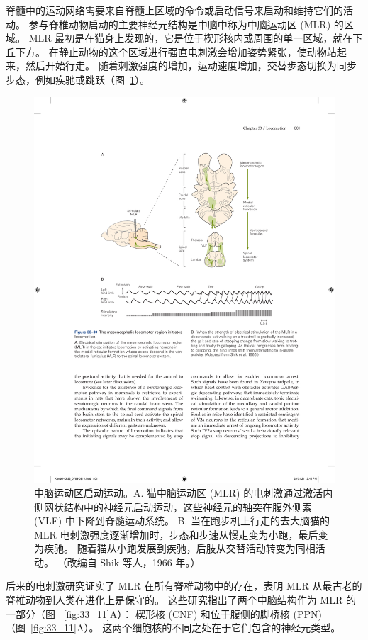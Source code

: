 脊髓中的运动网络需要来自脊髓上区域的命令或启动信号来启动和维持它们的活动。
参与脊椎动物启动的主要神经元结构是中脑中称为中脑运动区 (MLR) 的区域。
MLR 最初是在猫身上发现的，它是位于楔形核内或周围的单一区域，就在下丘下方。
在静止动物的这个区域进行强直电刺激会增加姿势紧张，使动物站起来，然后开始行走。
随着刺激强度的增加，运动速度增加，交替步态切换为同步步态，例如疾驰或跳跃（图~\ref{fig:33_10}）。


\begin{figure}[htbp]
	\centering
	\includegraphics[width=0.7\linewidth]{chap33/fig_33_10}
	\caption{中脑运动区启动运动。A. 猫中脑运动区 (MLR) 的电刺激通过激活内侧网状结构中的神经元启动运动，这些神经元的轴突在腹外侧索 (VLF) 中下降到脊髓运动系统。 B. 当在跑步机上行走的去大脑猫的 MLR 电刺激强度逐渐增加时，步态和步速从慢走变为小跑，最后变为疾驰。 随着猫从小跑发展到疾驰，后肢从交替活动转变为同相活动。 （改编自 Shik 等人，1966 年。）}
	\label{fig:33_10}
\end{figure}


后来的电刺激研究证实了 MLR 在所有脊椎动物中的存在，表明 MLR 从最古老的脊椎动物到人类在进化上是保守的。
这些研究指出了两个中脑结构作为 MLR 的一部分（图 ~\ref{fig:33_11}A）：
楔形核 (CNF) 和位于腹侧的脚桥核 (PPN)（图~\ref{fig:33_11}A）。
这两个细胞核的不同之处在于它们包含的神经元类型。


